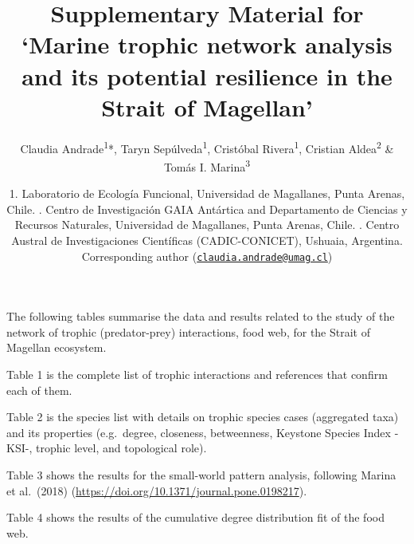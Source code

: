 \documentclass[
]{article}
\title{Supplementary Material for `Marine trophic network analysis and
its potential resilience in the Strait of Magellan'}
\author{Claudia Andrade\textsuperscript{1}*, Taryn
Sepúlveda\textsuperscript{1}, Cristóbal Rivera\textsuperscript{1},
Cristian Aldea\textsuperscript{2} \& Tomás I. Marina\textsuperscript{3}}
\date{1. Laboratorio de Ecología Funcional, Universidad de Magallanes,
Punta Arenas, Chile. \newline 2. Centro de Investigación GAIA Antártica
and Departamento de Ciencias y Recursos Naturales, Universidad de
Magallanes, Punta Arenas, Chile. \newline 3. Centro Austral de
Investigaciones Científicas (CADIC-CONICET), Ushuaia, Argentina.
\newline *Corresponding author
(\href{mailto:claudia.andrade@umag.cl}{\nolinkurl{claudia.andrade@umag.cl}})}
\begin{document}
\maketitle

The following tables summarise the data and results related to the study
of the network of trophic (predator-prey) interactions, food web, for
the Strait of Magellan ecosystem.

Table 1 is the complete list of trophic interactions and references that
confirm each of them.

Table 2 is the species list with details on trophic species cases
(aggregated taxa) and its properties (e.g.~degree, closeness,
betweenness, Keystone Species Index -KSI-, trophic level, and
topological role).

Table 3 shows the results for the small-world pattern analysis,
following Marina et al.~(2018)
(\url{https://doi.org/10.1371/journal.pone.0198217}).

Table 4 shows the results of the cumulative degree distribution fit of
the food web.
\end{document}
